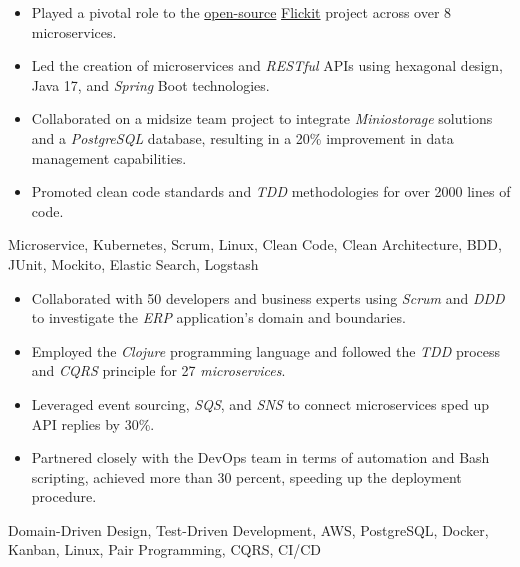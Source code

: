 \vspace*{-10pt}
\begin{experiences}
{

  \begin{itemize}
    \item Played a pivotal role to the \href{https://github.com/flickit-platform/flickit-assessment}{open-source} \href{https://flickit.org/}{Flickit} project across over 8 microservices.
    \item Led the creation of microservices and \emph{RESTful} APIs using hexagonal design, Java 17, and \emph{Spring} Boot technologies.
    \item Collaborated on a midsize team project to integrate \emph{Miniostorage} solutions and a \emph{PostgreSQL} database, resulting in a 20\% improvement in data management capabilities.
    \item Promoted clean code standards and \emph{TDD} methodologies for over 2000 lines of code. \end{itemize}}
  {Microservice, Kubernetes, Scrum, Linux, Clean Code, Clean Architecture, BDD, JUnit, Mockito, Elastic Search, Logstash} 
 \emptySeparator
 {
\begin{itemize}
   \item Collaborated with 50 developers and business experts using \emph{Scrum} and \emph{DDD} to investigate the \textit{ERP} application's domain and boundaries.
   \item Employed the \emph{Clojure} programming language and followed the \emph{TDD} process and \textit{CQRS} principle for 27 \emph{microservices}.
   \item Leveraged event sourcing, \emph{SQS}, and \emph{SNS} to connect microservices sped up API replies by 30\%.
   \item Partnered closely with the DevOps team in terms of automation and Bash scripting, achieved more than 30 percent, speeding up the deployment procedure.
   \end{itemize}}{Domain-Driven Design, Test-Driven Development, AWS, PostgreSQL, Docker, Kanban, Linux, Pair Programming, CQRS, CI/CD}

\end{experiences}
